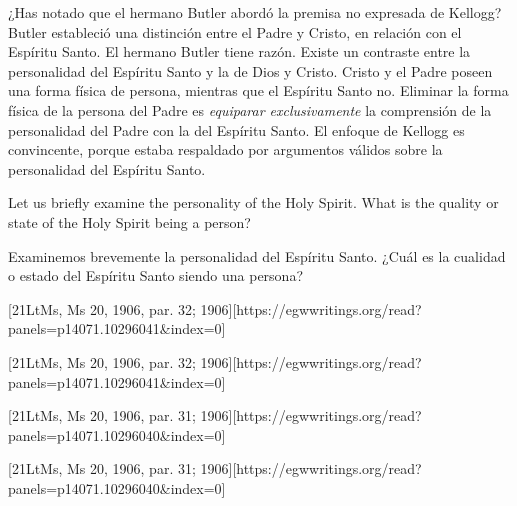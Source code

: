 ¿Has notado que el hermano Butler abordó la premisa no expresada de Kellogg? Butler estableció una distinción entre el Padre y Cristo, en relación con el Espíritu Santo. El hermano Butler tiene razón. Existe un contraste entre la personalidad del Espíritu Santo y la de Dios y Cristo. Cristo y el Padre poseen una forma física de persona, mientras que el Espíritu Santo no. Eliminar la forma física de la persona del Padre es \textit{equiparar exclusivamente} la comprensión de la personalidad del Padre con la del Espíritu Santo. El enfoque de Kellogg es convincente, porque estaba respaldado por argumentos válidos sobre la personalidad del Espíritu Santo.


Let us briefly examine the personality of the Holy Spirit. What is the quality or state of the Holy Spirit being a person?


Examinemos brevemente la personalidad del Espíritu Santo. ¿Cuál es la cualidad o estado del Espíritu Santo siendo una persona?


[21LtMs, Ms 20, 1906, par. 32; 1906][https://egwwritings.org/read?panels=p14071.10296041&index=0]


[21LtMs, Ms 20, 1906, par. 32; 1906][https://egwwritings.org/read?panels=p14071.10296041&index=0]


[21LtMs, Ms 20, 1906, par. 31; 1906][https://egwwritings.org/read?panels=p14071.10296040&index=0]


[21LtMs, Ms 20, 1906, par. 31; 1906][https://egwwritings.org/read?panels=p14071.10296040&index=0]


